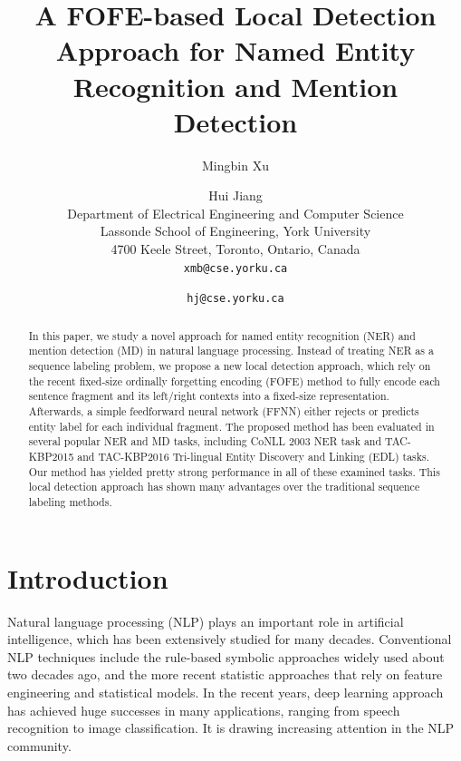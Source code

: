 \documentclass[11pt,a4paper]{article}
\title{A FOFE-based Local Detection Approach for Named Entity Recognition and Mention Detection}
\author{Mingbin Xu \and Hui Jiang \\
	Department of Electrical Engineering and Computer Science \\
	Lassonde School of Engineering, York University \\
	4700 Keele Street, Toronto, Ontario, Canada\\
	{\tt xmb@cse.yorku.ca} \and  {\tt hj@cse.yorku.ca}  
}
\date{}
\begin{document}
\maketitle


\begin{abstract}
	In this paper, we study a novel approach for named entity recognition (NER) and mention detection (MD) in natural language processing. Instead of treating NER as a sequence labeling problem, we propose a new local detection approach, which rely on the recent fixed-size ordinally forgetting encoding (FOFE) method to fully encode each sentence fragment and its left/right contexts into a fixed-size representation. Afterwards, a simple feedforward neural network (FFNN) either rejects or predicts entity label for each individual fragment. The proposed method has been evaluated in several popular NER and MD tasks, including CoNLL 2003 NER task and  TAC-KBP2015 and TAC-KBP2016 Tri-lingual Entity Discovery and Linking (EDL) tasks. Our method has yielded pretty strong performance in all of these examined tasks. This local detection approach has shown many advantages over the traditional sequence labeling  methods.
\end{abstract}


\section{Introduction}

Natural language processing (NLP) plays an important role in artificial intelligence, which has been extensively studied for many decades. Conventional NLP techniques include the rule-based symbolic approaches widely used about two decades ago, and the more recent statistic approaches that rely on feature engineering and statistical models. In the recent years, deep learning approach has achieved huge successes in many applications, ranging from speech recognition to image classification. It is drawing increasing attention in the NLP community. 
\end{document}
